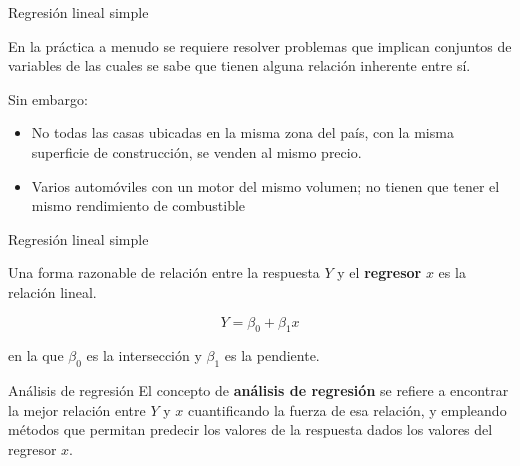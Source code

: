 \documentclass[11pt]{beamer}
\begin{document}
       \begin{frame}{Regresión lineal simple}
           \begin{block}{}
               En la práctica a menudo se requiere resolver problemas que implican conjuntos de variables de las cuales se sabe que tienen alguna relación inherente entre sí.
           \end{block}
           \pause
           Sin embargo:
           \begin{block}{}
             \begin{itemize}
                 \item No todas las casas ubicadas en la misma zona del país, con la misma superficie de construcción, se venden al mismo precio.
                 \item Varios automóviles con un motor del mismo volumen; no tienen que tener el mismo rendimiento de combustible
             \end{itemize}
           \end{block}
       \end{frame}
       \begin{frame}{Regresión lineal simple}
           \begin{block}{}
              Una forma razonable de relación entre la respuesta $Y$ y
el \textbf{regresor} $x$ es la relación lineal.

              $$ Y = \beta_0+\beta_1x$$

              en la que $\beta_0$ es la intersección y $\beta_1$ es la pendiente.
           \end{block}
           \pause
           \begin{block}{Análisis de regresión}
               El
concepto de \textbf{análisis de regresión} se refiere a encontrar la mejor relación entre $Y$ y $x$ cuantificando la fuerza de esa relación, y empleando métodos que permitan predecir los
valores de la respuesta dados los valores del regresor $x$.
           \end{block}
       \end{frame}

\end{document}
